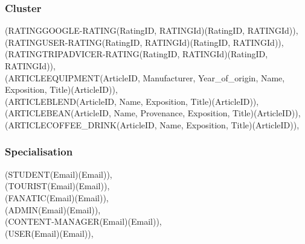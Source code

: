 {\subsubsection{Cluster}
(RATINGGOOGLE-RATING(RatingID, RATINGId)(RatingID, RATINGId)), \\
(RATINGUSER-RATING(RatingID, RATINGId)(RatingID, RATINGId)), \\
(RATINGTRIPADVICER-RATING(RatingID, RATINGId)(RatingID, RATINGId)), \\
(ARTICLEEQUIPMENT(ArticleID, Manufacturer, Year\_of\_origin, Name, Exposition, Title)(ArticleID)), \\
(ARTICLEBLEND(ArticleID, Name, Exposition, Title)(ArticleID)), \\
(ARTICLEBEAN(ArticleID, Name, Provenance, Exposition, Title)(ArticleID)), \\
(ARTICLECOFFEE\_DRINK(ArticleID, Name, Exposition, Title)(ArticleID)), \\
\subsubsection{Specialisation}
(STUDENT(Email)(Email)), \\
(TOURIST(Email)(Email)), \\
(FANATIC(Email)(Email)), \\
(ADMIN(Email)(Email)), \\
(CONTENT-MANAGER(Email)(Email)), \\
(USER(Email)(Email)), \\
 } 
